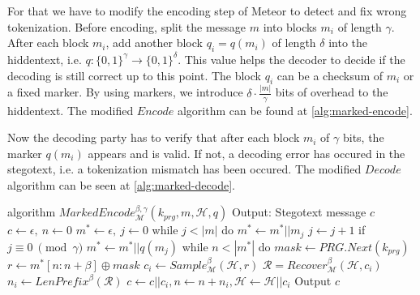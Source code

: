 For that we have to modify the encoding step of Meteor to detect and fix wrong tokenization.
Before encoding, split the message $m$ into blocks $m_i$ of length $\gamma$.
After each block $m_i$, add another block $q_i = q(m_i)$ of length $\delta$ into the hiddentext, i.e. $q \colon \{ 0,1 \}^\gamma \rightarrow \{ 0,1 \}^\delta$.
This value helps the decoder to decide if the decoding is still correct up to this point.
The block $q_i$ can be a checksum of $m_i$ or a fixed marker.
By using markers, we introduce $\delta \cdot \frac{|m|}{\gamma}$ bits of overhead to the hiddentext.
The modified $Encode$ algorithm can be found at \autoref{alg:marked-encode}.

Now the decoding party has to verify that after each block $m_i$ of $\gamma$ bits, the marker $q(m_i)$ appears and is valid.
If not, a decoding error has occured in the stegotext, i.e. a tokenization mismatch has been occured.
The modified $Decode$ algorithm can be seen at \autoref{alg:marked-decode}.

\begin{Pseudocode}[float, caption={
Marked Encode Algorithm. 
The modification this algorithm introduces is that after every $j$ bits a checksum $q(m_i)$ is inserted into the hiddentext.
This allows the recipient to check for decoding errors due to wrong tokenization.
$q$ is a function which generates a checksum of fixed length $\delta$.
}, label={alg:marked-encode}]
algorithm $MarkedEncode_{\mathcal{M}}^{\beta, \gamma}(k_{prg}, m, \mathcal{H}, q)$
	Output: Stegotext message $c$
	$c \leftarrow \epsilon,~ n \leftarrow 0$
	$m^* \leftarrow \epsilon,~ j \leftarrow 0$
	while $j < |m|$ do
		$m^* \leftarrow m^* || m_j$
		$j \leftarrow j + 1$
		if $j \equiv 0~ \pmod \gamma$
			$m^* \leftarrow m^* || q(m_j)$
	while $n < |m^*|$ do
		$mask \leftarrow PRG.Next(k_{prg})$
		$r \leftarrow m^*[n:n+\beta] \oplus mask$
		$c_i \leftarrow Sample_{\mathcal{M}}^\beta(\mathcal{H}, r)$
		$\mathcal{R} = Recover_{\mathcal{M}}^\beta(\mathcal{H}, c_i)$
		$n_i \leftarrow LenPrefix^\beta(\mathcal{R})$
		$c \leftarrow c || c_i, n \leftarrow n+n_i, \mathcal{H} \leftarrow \mathcal{H}||c_i$
	Output $c$
\end{Pseudocode}



